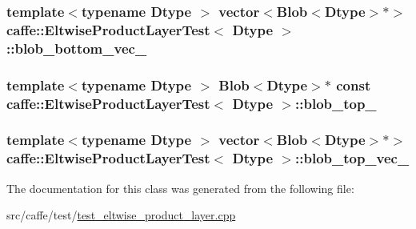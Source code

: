 \hypertarget{classcaffe_1_1_eltwise_product_layer_test_ad32b1991564800fa597cd39b3dd20f92}{
\subsubsection[{blob\+\_\+bottom\+\_\+vec\+\_\+}]{\setlength{\rightskip}{0pt plus 5cm}template$<$typename Dtype $>$ vector$<${\bf Blob}$<$Dtype$>$$\ast$$>$ {\bf caffe\+::\+Eltwise\+Product\+Layer\+Test}$<$ Dtype $>$\+::blob\+\_\+bottom\+\_\+vec\+\_\+\hspace{0.3cm}{\ttfamily [protected]}}}\label{classcaffe_1_1_eltwise_product_layer_test_ad32b1991564800fa597cd39b3dd20f92}
\hypertarget{classcaffe_1_1_eltwise_product_layer_test_a3473d2cf8c1b5de2251a98177de1e50e}{
\subsubsection[{blob\+\_\+top\+\_\+}]{\setlength{\rightskip}{0pt plus 5cm}template$<$typename Dtype $>$ {\bf Blob}$<$Dtype$>$$\ast$ const {\bf caffe\+::\+Eltwise\+Product\+Layer\+Test}$<$ Dtype $>$\+::blob\+\_\+top\+\_\+\hspace{0.3cm}{\ttfamily [protected]}}}\label{classcaffe_1_1_eltwise_product_layer_test_a3473d2cf8c1b5de2251a98177de1e50e}
\hypertarget{classcaffe_1_1_eltwise_product_layer_test_a59ea3d7e02db32dbfcb14cf068f4ebd8}{
\subsubsection[{blob\+\_\+top\+\_\+vec\+\_\+}]{\setlength{\rightskip}{0pt plus 5cm}template$<$typename Dtype $>$ vector$<${\bf Blob}$<$Dtype$>$$\ast$$>$ {\bf caffe\+::\+Eltwise\+Product\+Layer\+Test}$<$ Dtype $>$\+::blob\+\_\+top\+\_\+vec\+\_\+\hspace{0.3cm}{\ttfamily [protected]}}}\label{classcaffe_1_1_eltwise_product_layer_test_a59ea3d7e02db32dbfcb14cf068f4ebd8}


The documentation for this class was generated from the following file\+:\begin{DoxyCompactItemize}
\item 
src/caffe/test/\hyperlink{test__eltwise__product__layer_8cpp}{test\+\_\+eltwise\+\_\+product\+\_\+layer.\+cpp}\end{DoxyCompactItemize}
